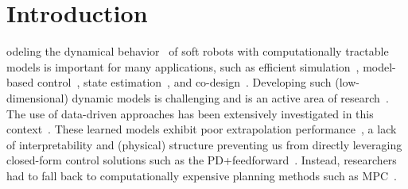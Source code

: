 \section{Introduction}
odeling the dynamical behavior~\citep{armanini2023soft} of soft robots with computationally tractable models is important for many applications, such as efficient simulation~\citep{alkayas2025soft}, model-based control~\citep{della2023model}, state estimation~\citep{shao2023model}, and co-design~\citep{wang2024diffusebot}. 
%
% 
Developing such (low-dimensional) dynamic models is challenging and is an active area of research~\citep{alora2023data, armanini2023soft}. The use of data-driven approaches has been extensively investigated in this context~\citep{thuruthel2017learning, bruder2020data, alora2023data, chen2024data}.
These learned models exhibit poor extrapolation performance~\citep{kim2021review}, a lack of interpretability and (physical) structure preventing us from directly leveraging closed-form control solutions such as the PD+feedforward~\citep{della2023model}. Instead, researchers had to fall back to computationally expensive planning methods such as \gls{MPC}~\citep{bruder2020data, alora2023data}.

